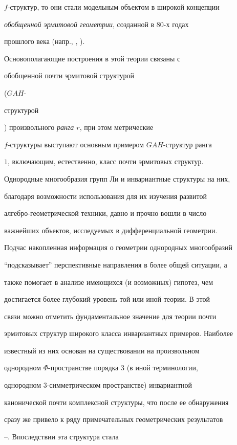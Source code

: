 $f$-структур, то они стали модельным объектом в широкой концепции


{\it обобщенной эрмитовой геометрии}, созданной в 80-х годах


прошлого века (напр., \cite{3}, \cite{4}).


Основополагающие построения в этой теории связаны с {\it


обобщенной почти эрмитовой структурой} ($GAH$-{\it


структурой}) произвольного {\it ранга $r$}, при этом метрические\linebreak


$f$-структуры выступают основным примером $GAH$-структур ранга


$1$, включающим, естественно, класс почти эрмитовых структур.





Однородные многообразия групп Ли и инвариантные структуры на них,


благодаря возможности использования для их изучения развитой


алгебро-геометрической техники, давно и прочно вошли в число


важнейших объектов, исследуемых в дифференциальной геометрии.


Подчас накопленная информация о геометрии однородных многообразий


``подсказывает'' перспективные направления в более общей ситуации, а


также помогает в анализе имеющихся (и возможных) гипотез, чем


достигается более глубокий уровень той или иной теории. В этой


связи можно отметить фундаментальное значение для теории почти


эрмитовых структур широкого класса инвариантных примеров. Наиболее


известный из них основан на существовании на произвольном


однородном $\Phi$-пространстве порядка $3$ (в иной терминологии,


однородном $3$-симметрическом пространстве) инвариантной


канонической почти комплексной структуры, что после ее обнаружения


сразу же привело к ряду примечательных геометрических результатов


\cite{5}--\cite{8}. Впоследствии эта структура стала


